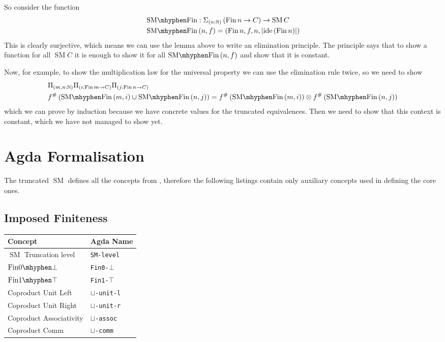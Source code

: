 \documentclass[12pt, parskip, DIV=14]{scrbook}
\newcommand{\SM}{\operatorname{SM}}
\newcommand{\Fin}{\operatorname{Fin}}
\newcommand{\finempty}{\operatorname{Fin0\mhyphen\bot}}
\newcommand{\finunit}{\operatorname{Fin1\mhyphen\top}}
\newcommand{\smfin}{\operatorname{SM\mhyphen Fin}}
\begin{document}
So consider the function
\begin{align*}
  & \smfin : \Sigma_{(n : \mathbb{N})}\,(\Fin n \to C) \to \SM C \\
  & \smfin\,(n , f) = (\Fin n , f , n , | \mathrm{ide}\,(\Fin n) |)
\end{align*}
This is clearly surjective, which means we can use the lemma above to write an elimination principle. The principle says that to show a function for all $\SM C$ it is enough to show it for all $\smfin\,(n , f)$ and show that it is constant.

Now, for example, to show the multiplication law for the universal property we can use the elimination rule twice, so we need to show
\begin{align*}
  &\Pi_{(m , n : \mathbb{N})}\Pi_{(i : \Fin m \to C)}\Pi_{(j : \Fin n \to C)} \\
  &f^\#\,(\smfin\,(m , i) \cup \smfin\,(n , j)) = f^\#\,(\smfin\,(m , i)) \otimes f^\#\,(\smfin\,(n , j))
\end{align*}
which we can prove by induction because we have concrete values for the truncated equivalences. Then we need to show that this context is constant, which we have not managed to show yet.

\section{Agda Formalisation}

The truncated $\SM$ defines all the concepts from , therefore the following listings contain only auxiliary concepts used in defining the core ones.

\subsection{Imposed Finiteness}

\begin{center}
\begin{tabular}{ll}
  Concept & Agda Name \\
  \hline
  $\SM$ Truncation level & \texttt{SM-level} \\
  $\finempty$ & \texttt{Fin0-$\bot$} \\
  $\finunit$ & \texttt{Fin1-$\top$} \\
  Coproduct Unit Left & \texttt{$\sqcup$-unit-l} \\
  Coproduct Unit Right & \texttt{$\sqcup$-unit-r} \\
  Coproduct Associativity & \texttt{$\sqcup$-assoc} \\
  Coproduct Comm & \texttt{$\sqcup$-comm} \\
\end{tabular}
\end{center}
\end{document}
